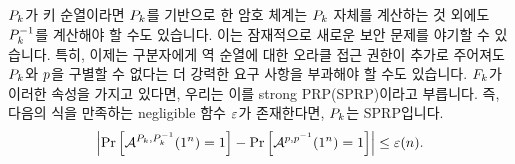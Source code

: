 $P_{k}$가 키 순열이라면 $P_{k}$를 기반으로 한 암호 체계는 $P_{k}$ 자체를 계산하는 것 외에도 
$P^{-1}_{k}$를 계산해야 할 수도 있습니다. 이는 잠재적으로 새로운 보안 문제를 야기할 수 있습니다. 
특히, 이제는 구분자에게 역 순열에 대한 오라클 접근 권한이 추가로 주어져도 $P_{k}$와 $p$을 구별할 수 
없다는 더 강력한 요구 사항을 부과해야 할 수도 있습니다. $F_{k}$가 이러한 속성을 가지고 있다면, 우리는 
이를 strong PRP(SPRP)이라고 부릅니다. 즉, 다음의 식을 만족하는 negligible 함수 $\varepsilon$가 
존재한다면, $P_{k}$는 SPRP입니다.
\begin{equation}
  \left| \text{Pr} \left[ \mathcal{A}^{P_{k}, P^{-1}_{k}}(1^n) = 1 \right] - \text{Pr} \left[ \mathcal{A}^{p, p^{-1}}(1^n) = 1 \right] \right|
  \le \varepsilon(n).
\end{equation}